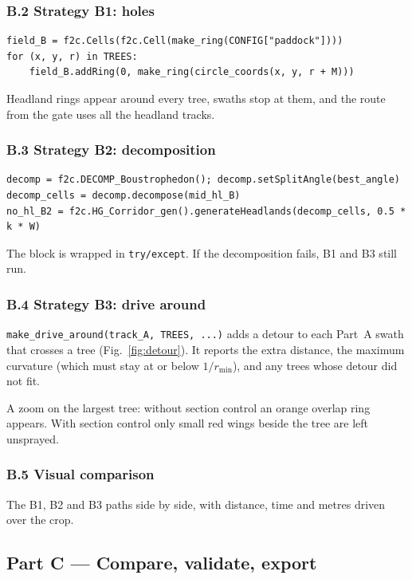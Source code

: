 \documentclass[11pt,a4paper]{article}
\newcommand{\code}[1]{\texttt{\small #1}}
\begin{document}
\subsubsection*{B.2 Strategy B1: holes}
\begin{lstlisting}
field_B = f2c.Cells(f2c.Cell(make_ring(CONFIG["paddock"])))
for (x, y, r) in TREES:
    field_B.addRing(0, make_ring(circle_coords(x, y, r + M)))
\end{lstlisting}
Headland rings appear around every tree, swaths stop at them, and the route from the gate uses all the headland tracks.

\subsubsection*{B.3 Strategy B2: decomposition}
\begin{lstlisting}
decomp = f2c.DECOMP_Boustrophedon(); decomp.setSplitAngle(best_angle)
decomp_cells = decomp.decompose(mid_hl_B)
no_hl_B2 = f2c.HG_Corridor_gen().generateHeadlands(decomp_cells, 0.5 * k * W)
\end{lstlisting}
The block is wrapped in \code{try/except}. If the decomposition fails, B1 and B3 still run.

\subsubsection*{B.4 Strategy B3: drive around} \code{make\_drive\_around(track\_A, TREES, ...)} adds a detour to each Part~A swath that crosses a tree
(Fig.~\ref{fig:detour}). It reports the extra distance, the maximum curvature (which must stay at or below $1/r_{\min}$), and any trees whose detour did not fit.
\begin{seebox}A zoom on the largest tree: without section control an orange overlap ring appears. With section control only small red wings
beside the tree are left unsprayed.\end{seebox}

\subsubsection*{B.5 Visual comparison} The B1, B2 and B3 paths side by side, with distance, time and metres driven over the crop.

\subsection*{Part C --- Compare, validate, export}
\end{document}
